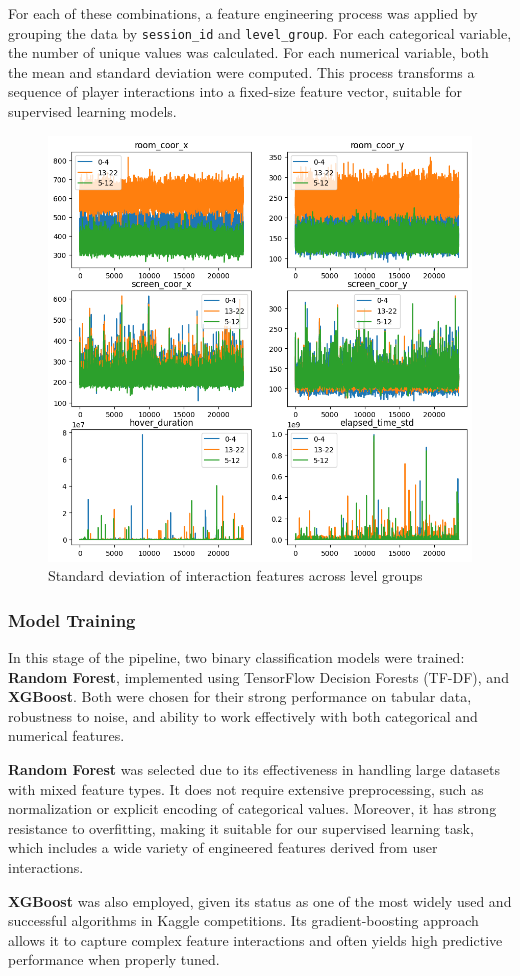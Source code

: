 \documentclass[12pt]{article}
\begin{document}
For each of these combinations, a feature engineering process was applied by grouping the data by \texttt{session\_id} and \texttt{level\_group}. For each categorical variable, the number of unique values was calculated. For each numerical variable, both the mean and standard deviation were computed. This process transforms a sequence of player interactions into a fixed-size feature vector, suitable for supervised learning models.

\begin{figure}[H]
    \centering
    \includegraphics[width=0.5\linewidth]{src/othergrpahics.png}
    \caption{Standard deviation of interaction features across level groups}
    \label{fig:feature-variability}
\end{figure}

	
	\subsubsection{Model Training}

In this stage of the pipeline, two binary classification models were trained: \textbf{Random Forest}, implemented using TensorFlow Decision Forests (TF-DF), and \textbf{XGBoost}. Both were chosen for their strong performance on tabular data, robustness to noise, and ability to work effectively with both categorical and numerical features.

\textbf{Random Forest} was selected due to its effectiveness in handling large datasets with mixed feature types. It does not require extensive preprocessing, such as normalization or explicit encoding of categorical values. Moreover, it has strong resistance to overfitting, making it suitable for our supervised learning task, which includes a wide variety of engineered features derived from user interactions.

\textbf{XGBoost} was also employed, given its status as one of the most widely used and successful algorithms in Kaggle competitions. Its gradient-boosting approach allows it to capture complex feature interactions and often yields high predictive performance when properly tuned.
\end{document}
